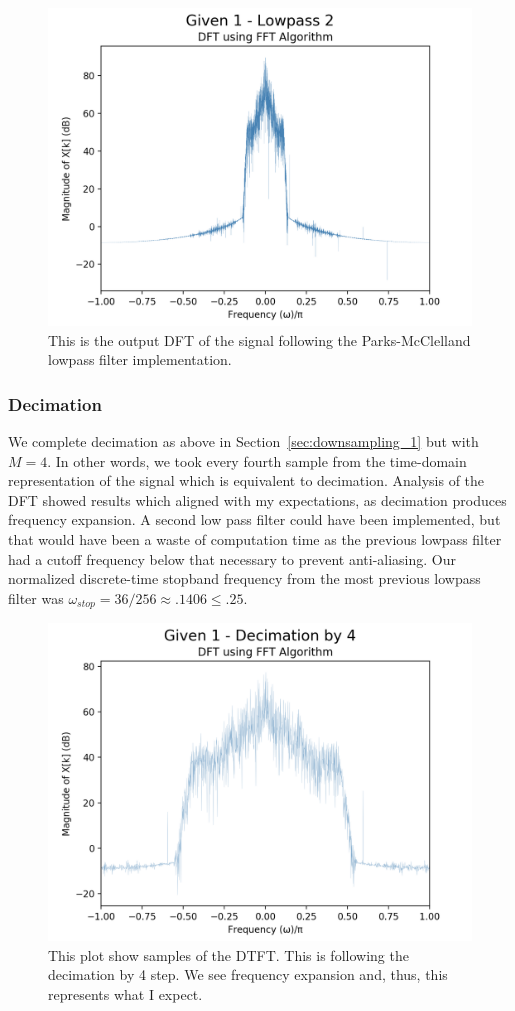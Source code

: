 \documentclass{article}
\begin{document}
\begin{figure}[h] \label{fig:lowpass_2}
    \caption{}
    \centering
    \includegraphics[width=.5\textwidth]{given_1_lowpass_2.png}
    \caption{This is the output DFT of the signal following the Parks-McClelland lowpass filter implementation.}
\end{figure}

\subsubsection{Decimation}

We complete decimation as above in Section~\ref{sec:downsampling_1} but with $M=4$. In other words, we took every fourth sample from the time-domain representation of the signal which is equivalent to decimation. Analysis of the DFT showed results which aligned with my expectations, as decimation produces frequency expansion. A second low pass filter could have been implemented, but that would have been a waste of computation time as the previous lowpass filter had a cutoff frequency below that necessary to prevent anti-aliasing. Our normalized discrete-time stopband frequency from the most previous lowpass filter was $\omega_{stop} = 36/256 \approx .1406 \leq .25$.

\begin{figure}[h] \label{fig:decimation}
    \caption{}
    \centering
    \includegraphics[width=.5\textwidth]{given_1_decimation_by_4.png}
    \caption{This plot show samples of the DTFT. This is following the decimation by 4 step. We see frequency expansion and, thus, this represents what I expect.}
\end{figure}
\end{document}
